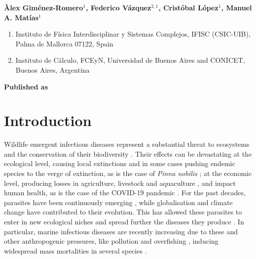 \vspace{1cm}

\textbf{Àlex Giménez-Romero$^{1}$, Federico Vázquez$^{2,1}$, Cristóbal
    López$^{1}$, Manuel A. Matías$^{1}$}

\vspace{1cm}

\begin{enumerate}
    \small
    \item Instituto de Física Interdisciplinar y Sistemas Complejos, IFISC
          (CSIC-UIB), Palma de Mallorca 07122, Spain
    \item Instituto de Cálculo, FCEyN, Universidad de Buenos Aires and CONICET,
          Buenos Aires, Argentina

\end{enumerate}

\vspace{1cm}

\textbf{Published as}

\vspace{0.5cm}


\newpage
\section{Introduction}

Wildlife emergent infectious diseases represent a substantial threat to
ecosystems and the conservation of their biodiversity \cite{Daszak443}. Their
effects can be devastating at the ecological level, causing local extinctions
\cite{Daszak443} and in some cases pushing endemic species to the verge of
extinction, as is the case of \textit{Pinna nobilis}
\cite{Cabanellas2019}; at the economic level, producing losses in agriculture,
livestock and aquaculture \cite{Vurro2010, Tomley2009, Pernet2016}, and impact
human health, as is the case of the COVID-19 pandemic \cite{Salata2020}. For
the past decades, parasites have been continuously emerging \cite{Morens2004,
    Daszak2017}, while globalisation and climate change have contributed to
their
evolution. This has allowed these parasites to enter in new ecological niches
and spread further the diseases they produce \cite{Aguirre2008}. In particular,
marine infectious diseases are recently increasing due to these and other
anthropogenic pressures, like pollution and overfishing \cite{Lafferty2004},
inducing widespread mass mortalities in several species \cite{Eisenlord2016,
    JONES201648, VAZQUEZ2017}.

